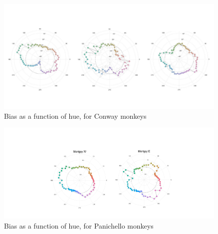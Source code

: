 

\begin{figure}
\includegraphics[width=\textwidth]{biasfigs.pdf}
\caption{Bias as a function of hue, for Conway monkeys} 
\end{figure}

\begin{figure}
\includegraphics[width=\textwidth]{panichellobias.pdf}
\caption{Bias as a function of hue, for Panichello monkeys} 
\end{figure}

